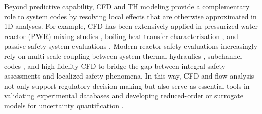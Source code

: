 \documentclass[review]{elsarticle}
\theoremstyle{definition}
\theoremstyle{definition}
\theoremstyle{remark}
\begin{document}
Beyond predictive capability, CFD and TH modeling provide a complementary role to system codes by resolving local effects that are otherwise approximated in 1D analyses. For example, CFD has been extensively applied in pressurized water reactor (PWR) mixing studies \cite{boyd2004cfd}, boiling heat transfer characterization \cite{pham2023assessment}, and passive safety system evaluations \cite{wei2023numerical}. Modern reactor safety evaluations increasingly rely on multi-scale coupling between system thermal-hydraulics \cite{hu2025sam}, subchannel codes \cite{salko2022ctf}, and high-fidelity CFD to bridge the gap between integral safety assessments and localized safety phenomena. In this way, CFD and flow analysis not only support regulatory decision-making \cite{boyd2016perspectives} but also serve as essential tools in validating experimental databases and developing reduced-order or surrogate models for uncertainty quantification \cite{liu2021uncertainty}. 

\begin{table}[!t]  

\small

\begin{framed}

\printnomenclature

\end{framed}

\end{table}


\end{document}
